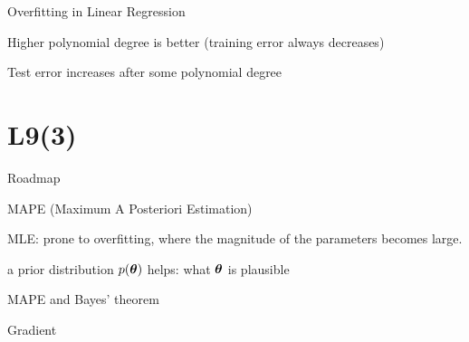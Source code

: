 \documentclass[handout,fleqn,aspectratio=169]{beamer}
\begin{document}
\begin{frame}{Overfitting in Linear Regression}

{
\vspace{-0.4cm}
}
{
}


\plitemsep 0.04in

\bci 

\item Higher polynomial degree is better (training error always decreases)

\item Test error increases after some polynomial degree
\eci
\end{frame}

\section{L9(3)}
\begin{frame}{Roadmap}

\plitemsep 0.1in

\bce[(1)] 

\item  {}
\item  {} 
\item  {} 
\item  {}

\ece
\end{frame}


\begin{frame}{MAPE (Maximum A Posteriori Estimation)}

\plitemsep 0.15in

\bci 

\item MLE: prone to overfitting, where the magnitude of the parameters becomes large.
\item a prior distribution $p(\bm{\theta})$ helps: what $\bm{\theta}$ is plausible 
\item MAPE and Bayes' theorem
\item Gradient

\eci

\end{frame}
\end{document}
